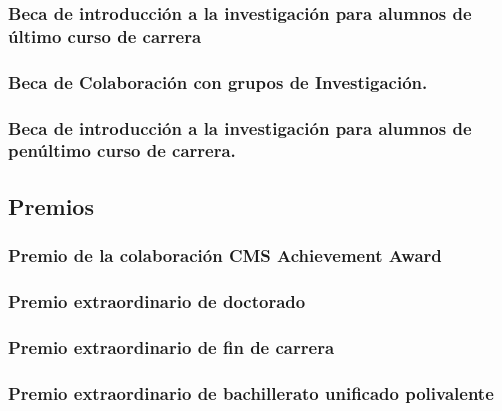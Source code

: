 \documentclass[a4paper, 11pt, twoside, openright]{report}
\begin{document}
\subsubsection{Beca de introducción a la investigación para alumnos de último curso de carrera}


\subsubsection{Beca de Colaboración con grupos de Investigación.}


\subsubsection{Beca de introducción a la investigación para alumnos de penúltimo curso de carrera.}



\subsection{Premios}


\subsubsection{Premio de la colaboración CMS Achievement Award}


\subsubsection{Premio extraordinario de doctorado}


\subsubsection{Premio extraordinario de fin de carrera}


\subsubsection{Premio extraordinario de bachillerato unificado polivalente}

\end{document}
